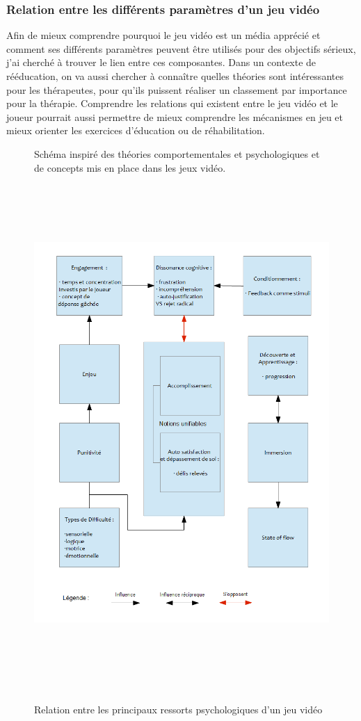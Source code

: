	\subsubsection*{Relation entre les différents paramètres d'un jeu vidéo}
Afin de mieux comprendre pourquoi le jeu vidéo est un média apprécié et comment ses différents paramètres peuvent être utilisés pour des objectifs sérieux, j'ai cherché à trouver le lien entre ces composantes. Dans un contexte de rééducation, on va aussi chercher à connaître quelles théories sont intéressantes pour les thérapeutes, pour qu'ils puissent réaliser un classement par importance pour la thérapie. Comprendre les relations qui existent entre le jeu vidéo et le joueur pourrait aussi permettre de mieux comprendre les mécanismes en jeu et mieux orienter les exercices d'éducation ou de réhabilitation.
\begin{figure}[htbp]
Schéma inspiré des théories comportementales et psychologiques et de concepts mis en place dans les jeux vidéo.
	\centering
	\includegraphics[height=19.6cm]{images/lien_theories}
	\caption{Relation entre les principaux ressorts psychologiques d'un jeu vidéo}
	\label{lien_theories}
\end{figure}			
